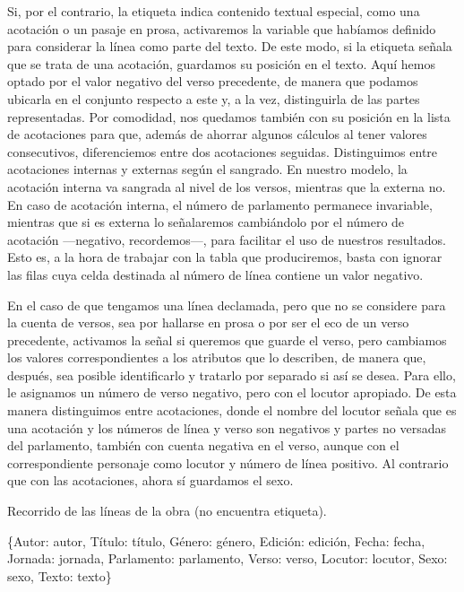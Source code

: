 Si, por el contrario, la etiqueta indica contenido textual especial, como una acotación o un pasaje en prosa, activaremos la variable que habíamos definido para considerar la línea como parte del texto. De este modo, si la etiqueta señala que se trata de una acotación, guardamos su posición en el texto. Aquí hemos optado por el valor negativo del verso precedente, de manera que podamos ubicarla en el conjunto respecto a este y, a la vez, distinguirla de las partes representadas. Por comodidad, nos quedamos también con su posición en la lista de acotaciones para que, además de ahorrar algunos cálculos al tener valores consecutivos, diferenciemos entre dos acotaciones seguidas. Distinguimos entre acotaciones internas y externas según el sangrado. En nuestro modelo, la acotación interna va sangrada al nivel de los versos, mientras que la externa no. En caso de acotación interna, el número de parlamento permanece invariable, mientras que si es externa lo señalaremos cambiándolo por el número de acotación —negativo, recordemos—, para facilitar el uso de nuestros resultados. Esto es, a la hora de trabajar con la tabla que produciremos, basta con ignorar las filas cuya celda destinada al número de línea contiene un valor negativo.

En el caso de que tengamos una línea declamada, pero que no se considere para la cuenta de versos, sea por hallarse en prosa o por ser el eco de un verso precedente, activamos la señal si queremos que guarde el verso, pero cambiamos los valores correspondientes a los atributos que lo describen, de manera que, después, sea posible identificarlo y tratarlo por separado si así se desea. Para ello, le asignamos un número de verso negativo, pero con el locutor apropiado. De esta manera distinguimos entre acotaciones, donde el nombre del locutor señala que es una acotación y los números de línea y verso son negativos y partes no versadas del parlamento, también con cuenta negativa en el verso, aunque con el correspondiente personaje como locutor y número de línea positivo. Al contrario que con las acotaciones, ahora sí guardamos el sexo.

\begin{algorithm}[!ht]
	\caption{Recorrido de las líneas de la obra (no encuentra etiqueta).}\label{list:normal4}
	\linea \gets \{Autor: autor, Título: título, Género: género,
	Edición: edición, Fecha: fecha,
	Jornada: jornada, Parlamento: parlamento, Verso: verso, Locutor: locutor,
	Sexo: sexo, Texto: texto\} \; 
\end{algorithm}

